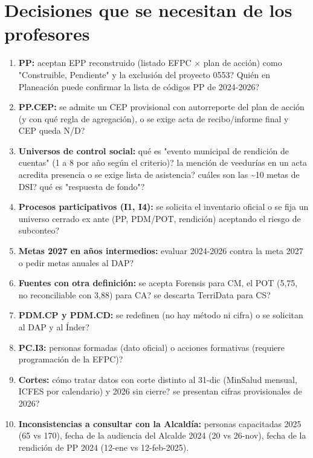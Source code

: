 \documentclass[11pt,letterpaper]{article}
\begin{document}
\section{Decisiones que se necesitan de los profesores}

\begin{enumerate}

\item \textbf{PP:} \textquestiondown{}aceptan EPP reconstruido (listado EFPC $\times$ plan de acción) como "Construible, Pendiente" y la exclusión del proyecto 0553? \textquestiondown{}Quién en Planeación puede confirmar la lista de códigos PP de 2024-2026?

\item \textbf{PP.CEP:} \textquestiondown{}se admite un CEP provisional con autorreporte del plan de acción (y con qué regla de agregación), o se exige acta de recibo/informe final y CEP queda N/D?

\item \textbf{Universos de control social:} \textquestiondown{}qué es "evento municipal de rendición de cuentas" (1 a 8 por año según el criterio)? \textquestiondown{}la mención de veedurías en un acta acredita presencia o se exige lista de asistencia? \textquestiondown{}cuáles son las \textasciitilde{}10 metas de DSI? \textquestiondown{}qué es "respuesta de fondo"?

\item \textbf{Procesos participativos (I1, I4):} \textquestiondown{}se solicita el inventario oficial o se fija un universo cerrado ex ante (PP, PDM/POT, rendición) aceptando el riesgo de subconteo?

\item \textbf{Metas 2027 en años intermedios:} \textquestiondown{}evaluar 2024-2026 contra la meta 2027 o pedir metas anuales al DAP?

\item \textbf{Fuentes con otra definición:} \textquestiondown{}se acepta Forensis para CM, el POT (5,75, no reconciliable con 3,88) para CA? \textquestiondown{}se descarta TerriData para CS?

\item \textbf{PDM.CP y PDM.CD:} \textquestiondown{}se redefinen (no hay método ni cifra) o se solicitan al DAP y al Índer?

\item \textbf{PC.I3:} \textquestiondown{}personas formadas (dato oficial) o acciones formativas (requiere programación de la EFPC)?

\item \textbf{Cortes:} \textquestiondown{}cómo tratar datos con corte distinto al 31-dic (MinSalud mensual, ICFES por calendario) y 2026 sin cierre? \textquestiondown{}se presentan cifras provisionales de 2026?

\item \textbf{Inconsistencias a consultar con la Alcaldía:} personas capacitadas 2025 (65 vs 170), fecha de la audiencia del Alcalde 2024 (20 vs 26-nov), fecha de la rendición de PP 2024 (12-ene vs 12-feb-2025).

\end{enumerate}
\end{document}
